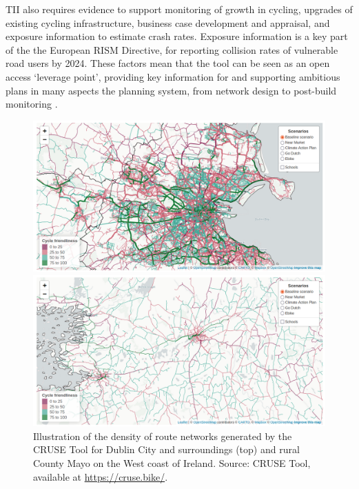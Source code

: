 \documentclass[
  super,
  preprint,
  3p]{elsarticle}
\begin{document}
TII also requires evidence to support monitoring of growth in cycling,
upgrades of existing cycling infrastructure, business case development
and appraisal, and exposure information to estimate crash rates.
Exposure information is a key part of the the European RISM Directive,
for reporting collision rates of vulnerable road users by 2024. These
factors mean that the tool can be seen as an open access `leverage
point', providing key information for and supporting ambitious plans in
many aspects the planning system, from network design to post-build
monitoring \citep{lovelace2020}.

\begin{figure}

{\centering 

\includegraphics{images/paste-1.png}

\includegraphics{images/paste-3.png}

}

\caption{\label{fig-dublin}Illustration of the density of route networks
generated by the CRUSE Tool for Dublin City and surroundings (top) and
rural County Mayo on the West coast of Ireland. Source: CRUSE Tool,
available at \url{https://cruse.bike/}.}

\end{figure}
\end{document}
